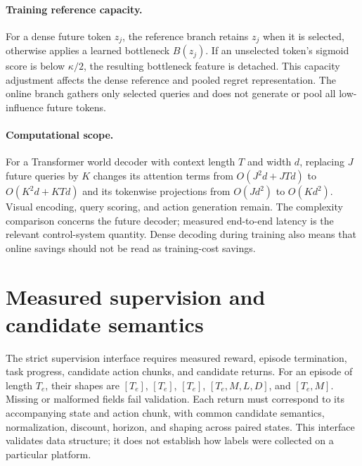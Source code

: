 \documentclass{article}
\begin{document}
\paragraph{Training reference capacity.}
For a dense future token $z_j$, the reference branch retains $z_j$ when it is selected, otherwise applies a learned bottleneck $B(z_j)$. If an unselected token's sigmoid score is below $\kappa/2$, the resulting bottleneck feature is detached. This capacity adjustment affects the dense reference and pooled regret representation. The online branch gathers only selected queries and does not generate or pool all low-influence future tokens.

\paragraph{Computational scope.}
For a Transformer world decoder with context length $T$ and width $d$, replacing $J$ future queries by $K$ changes its attention terms from $O(J^2d+JTd)$ to $O(K^2d+KTd)$ and its tokenwise projections from $O(Jd^2)$ to $O(Kd^2)$. Visual encoding, query scoring, and action generation remain. The complexity comparison concerns the future decoder; measured end-to-end latency is the relevant control-system quantity. Dense decoding during training also means that online savings should not be read as training-cost savings.



\section{Measured supervision and candidate semantics}
\label{app:supervision}
The strict supervision interface requires measured reward, episode termination, task progress, candidate action chunks, and candidate returns. For an episode of length $T_e$, their shapes are $[T_e]$, $[T_e]$, $[T_e]$, $[T_e,M,L,D]$, and $[T_e,M]$. Missing or malformed fields fail validation. Each return must correspond to its accompanying state and action chunk, with common candidate semantics, normalization, discount, horizon, and shaping across paired states. This interface validates data structure; it does not establish how labels were collected on a particular platform.
\end{document}
